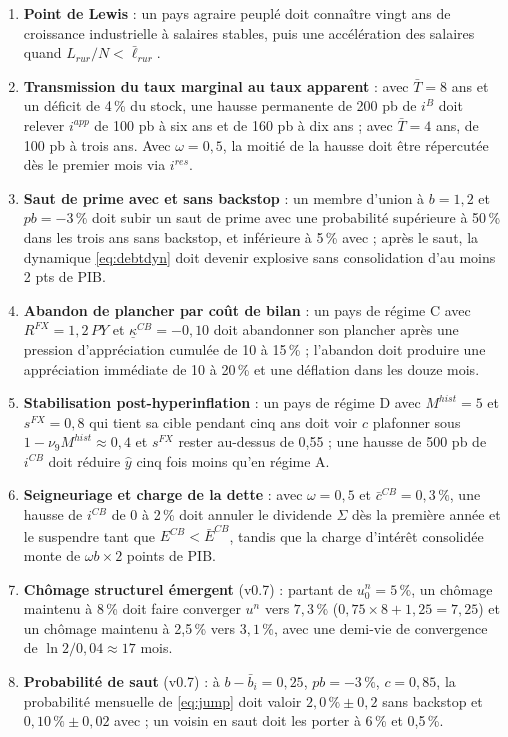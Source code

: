 \documentclass[11pt,a4paper]{article}
\begin{document}
\begin{enumerate}
\item \textbf{Point de Lewis} : un pays agraire peuplé doit connaître vingt ans de croissance industrielle à salaires stables, puis une accélération des salaires quand $L_{rur}/N < \bar\ell_{rur}$.
\item \textbf{Transmission du taux marginal au taux apparent} : avec $\bar T=8$ ans et un déficit de 4\,\% du stock, une hausse permanente de 200 pb de $i^B$ doit relever $i^{app}$ de 100 pb à six ans et de 160 pb à dix ans ; avec $\bar T=4$ ans, de 100 pb à trois ans. Avec $\omega=0{,}5$, la moitié de la hausse doit être répercutée dès le premier mois via $i^{res}$.
\item \textbf{Saut de prime avec et sans backstop} : un membre d'union à $b=1{,}2$ et $pb=-3\,\%$ doit subir un saut de prime avec une probabilité supérieure à 50\,\% dans les trois ans sans backstop, et inférieure à 5\,\% avec ; après le saut, la dynamique \eqref{eq:debtdyn} doit devenir explosive sans consolidation d'au moins 2 pts de PIB.
\item \textbf{Abandon de plancher par coût de bilan} : un pays de régime C avec $R^{FX}=1{,}2\,PY$ et $\underline\kappa^{CB}=-0{,}10$ doit abandonner son plancher après une pression d'appréciation cumulée de 10 à 15\,\% ; l'abandon doit produire une appréciation immédiate de 10 à 20\,\% et une déflation dans les douze mois.
\item \textbf{Stabilisation post-hyperinflation} : un pays de régime D avec $M^{hist}=5$ et $s^{FX}=0{,}8$ qui tient sa cible pendant cinq ans doit voir $c$ plafonner sous $1-\nu_9M^{hist}\approx0{,}4$ et $s^{FX}$ rester au-dessus de 0,55 ; une hausse de 500 pb de $i^{CB}$ doit réduire $\hat y$ cinq fois moins qu'en régime A.
\item \textbf{Seigneuriage et charge de la dette} : avec $\omega=0{,}5$ et $\bar c^{CB}=0{,}3\,\%$, une hausse de $i^{CB}$ de 0 à 2\,\% doit annuler le dividende $\Sigma$ dès la première année et le suspendre tant que $E^{CB}<\bar E^{CB}$, tandis que la charge d'intérêt consolidée monte de $\omega b\times2$ points de PIB.
\item \textbf{Chômage structurel émergent} (v0.7) : partant de $u^n_0=5\,\%$, un chômage maintenu à 8\,\% doit faire converger $u^n$ vers $7{,}3\,\%$ ($0{,}75\times8+1{,}25=7{,}25$) et un chômage maintenu à 2,5\,\% vers $3{,}1\,\%$, avec une demi-vie de convergence de $\ln 2/0{,}04\approx17$ mois.
\item \textbf{Probabilité de saut} (v0.7) : à $b-\bar b_i=0{,}25$, $pb=-3\,\%$, $c=0{,}85$, la probabilité mensuelle de \eqref{eq:jump} doit valoir $2{,}0\,\%\pm0{,}2$ sans backstop et $0{,}10\,\%\pm0{,}02$ avec ; un voisin en saut doit les porter à 6\,\% et 0,5\,\%.

\end{enumerate}
\end{document}
